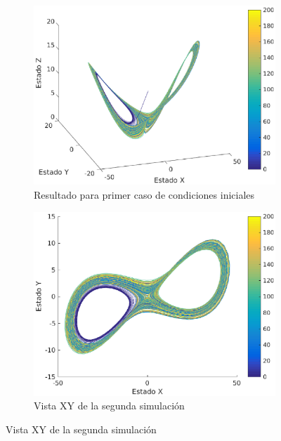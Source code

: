 \documentclass[12pt,letterpaper]{article}
\begin{document}
\begin{figure}
	\centering
	\begin{subfigure}[t]{0.36\textwidth}
		\includegraphics[width=\textwidth]{pictures/segunda_simulacion}
		\caption{Resultado para primer caso de condiciones iniciales}
		\label{fig:simulacion2}
	\end{subfigure}
	\begin{subfigure}[t]{0.36\textwidth}
		\includegraphics[width=\textwidth]{pictures/segunda_simulacion_xy}
		\caption{Vista XY de la segunda simulación}
		\label{fig:simulacion2xy}

\end{subfigure}
\end{figure}
\end{document}
